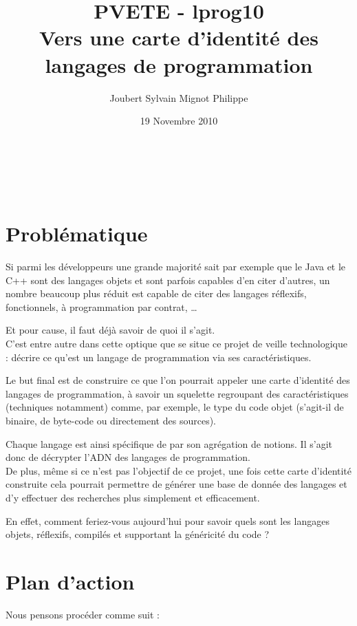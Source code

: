 \documentclass[a4paper, 11pt]{article}
\title{PVETE - lprog10\\
Vers une carte d'identité des langages de programmation}
\author{{\sc Joubert} Sylvain \hspace{1cm} {\sc Mignot} Philippe}
\date{19 Novembre 2010}
\begin{document}

\begin{center}
	\LARGE \thetitle \normalsize \\
	\vspace{2\baselineskip}
	\thedate \\
	\vspace{\baselineskip}
	\theauthor
\end{center}
\vspace*{5em}

\section{Problématique}
Si parmi les développeurs une grande majorité sait par exemple que le Java et le C++ sont des langages objets et sont parfois capables d'en citer d'autres, un nombre beaucoup plus réduit est capable de citer des langages réflexifs, fonctionnels, à programmation par contrat, …

Et pour cause, il faut déjà savoir de quoi il s'agit.\\

C'est entre autre dans cette optique que se situe ce projet de veille technologique : décrire ce qu'est un langage de programmation via ses caractéristiques.

Le but final est de construire ce que l'on pourrait appeler une carte d'identité des langages de programmation, à savoir un squelette regroupant des caractéristiques (techniques notamment) comme, par exemple, le type du code objet (s'agit-il de binaire, de byte-code ou directement des sources).

Chaque langage est ainsi spécifique de par son agrégation de notions. Il s'agit donc de décrypter l'ADN des langages de programmation.\\

De plus, même si ce n'est pas l'objectif de ce projet, une fois cette carte d'identité construite cela pourrait permettre de générer une base de donnée des langages et d'y effectuer des recherches plus simplement et efficacement.

En effet, comment feriez-vous aujourd'hui pour savoir quels sont les langages objets, réflexifs, compilés et supportant la généricité du code ?
	
\section{Plan d'action}
Nous pensons procéder comme suit :
\end{document}
